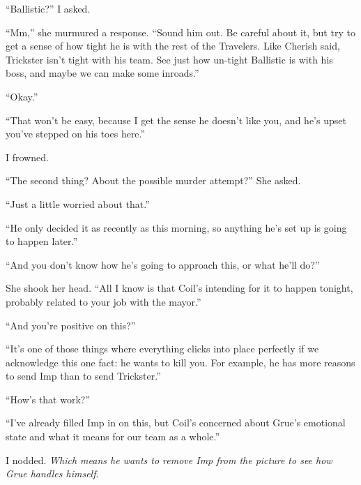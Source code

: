 ``Ballistic?'' I asked.



``Mm,'' she murmured a response.  ``Sound him out.  Be careful about it, but try to get a sense of how tight he is with the rest of the Travelers.  Like Cherish said, Trickster isn't tight with his team.  See just how un-tight Ballistic is with his boss, and maybe we can make some inroads.''



``Okay.''



``That won't be easy, because I get the sense he doesn't like you, and he's upset you've stepped on his toes here.''



I frowned.



``The second thing?  About the possible murder attempt?''  She asked.



``Just a little worried about that.''



``He only decided it as recently as this morning, so anything he's set up is going to happen later.''



``And you don't know how he's going to approach this, or what he'll do?''



She shook her head.  ``All I know is that Coil's intending for it to happen tonight, probably related to your job with the mayor.''



``And you're positive on this?''



``It's one of those things where everything clicks into place perfectly if we acknowledge this one fact: he wants to kill you.  For example, he has more reasons to send Imp than to send Trickster.''



``How's that work?''



``I've already filled Imp in on this, but Coil's concerned about Grue's emotional state and what it means for our team as a whole.''



I nodded.  \emph{Which means he wants to remove Imp from the picture to see how Grue handles himself}.




